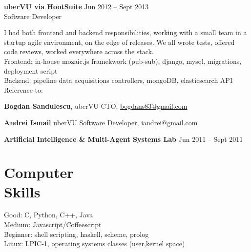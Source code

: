 \documentclass[margin,line]{resume}
\begin{document}
\begin{resume}
    \vspace{1.2mm}\textbf{uberVU via HootSuite}
        \hfill Jun 2012 -- Sept 2013\vspace{1mm}\\
        Software Developer\vspace{1.2mm}\\
    {\fontsize{2.65mm}{1em}\selectfont
      I had both frontend and backend responsibilities, working with a small team in a startup agile environment, on the edge of releases. We all wrote tests, offered code reviews, worked everywhere across the stack.\vspace{1.2mm}\\
      Frontend: in-house mozaic.js framekwork (pub-sub), django, mysql, migrations, deployment script\vspace{1.2mm}\\
      Backend: pipeline data acquisitions controllers, mongoDB, elasticsearch API\vspace{1.2mm}\\
      Reference to:
      \begin{list2}
          \item \textbf{Bogdan Sandulescu}, uberVU CTO, \href{mailto:bogdans83@gmail.com}{bogdans83@gmail.com}
          \item \textbf{Andrei Ismail} uberVU Software Developer, \href{mailto:iandrei@gmail.com}{iandrei@gmail.com}
      \end{list2}
    }

    \vspace{1.2mm}\textbf{Artificial Intelligence \& Multi-Agent Systems Lab}
        \hfill Jun 2011 -- Sept 2011
    \section{\mysidestyle Computer\\Skills}

    Good: C, Python, C++, Java                            \\
    Medium: Javascript/Coffeescript  \\
    Beginner: shell scripting, haskell, scheme, prolog                    \\
    Linux: LPIC-1, operating systems classes (user,kernel space)

   \pagebreak


\end{resume}
\end{document}
